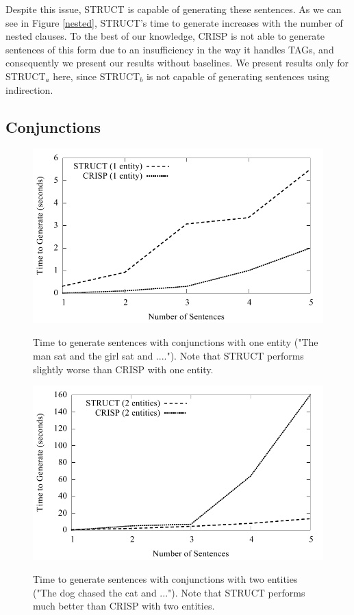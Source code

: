 Despite this issue, STRUCT is capable of generating these sentences.  As we can
see in Figure \ref{nested}, STRUCT's time to generate increases with the number of
nested clauses.  To the best of our knowledge, CRISP is not able to generate sentences
of this form due to an insufficiency in the way it handles TAGs,
and consequently we present our results without baselines.  We present
results only for STRUCT$_a$ here, since STRUCT$_b$ is not capable of generating
sentences using indirection.

\subsection{Conjunctions}

\begin{figure}
\centering
\includegraphics[width=0.7 \linewidth]{../analysis/struct/conjunction/conjunction1.pdf}
\label{graph-conjunction1}
\caption{Time to generate sentences with conjunctions with one entity ("The man sat and the girl sat and ....").
Note that STRUCT performs slightly worse than CRISP with one entity.}
\end{figure}

\begin{figure}
\centering
\includegraphics[width=0.7 \linewidth]{../analysis/struct/conjunction/conjunction2.pdf}
\label{graph-conjunction2}
\caption{Time to generate sentences with conjunctions with two entities ("The dog chased the cat and ...").  Note that
STRUCT performs much better than CRISP with two entities.}
\end{figure}

